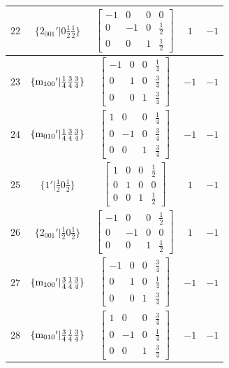 \documentclass[fleqn,8pt]{jsarticle}
\begin{document}
\begin{longtable}{ccccc}
$ 22 $ & $ \{2{}_{001}{}'|0 \frac{1}{2} \frac{1}{2}\} $ & $ \begin{bmatrix} -1 & 0 & 0 & 0 \\ 0 & -1 & 0 & \frac{1}{2} \\ 0 & 0 & 1 & \frac{1}{2} \end{bmatrix} $ & $ 1 $ & $ -1 $ \\ \hline
$ 23 $ & $ \{{\rm m}_{100}{}'|\frac{1}{4} \frac{3}{4} \frac{3}{4}\} $ & $ \begin{bmatrix} -1 & 0 & 0 & \frac{1}{4} \\ 0 & 1 & 0 & \frac{3}{4} \\ 0 & 0 & 1 & \frac{3}{4} \end{bmatrix} $ & $ -1 $ & $ -1 $ \\ \hline
$ 24 $ & $ \{{\rm m}_{010}{}'|\frac{1}{4} \frac{3}{4} \frac{3}{4}\} $ & $ \begin{bmatrix} 1 & 0 & 0 & \frac{1}{4} \\ 0 & -1 & 0 & \frac{3}{4} \\ 0 & 0 & 1 & \frac{3}{4} \end{bmatrix} $ & $ -1 $ & $ -1 $ \\ \hline
$ 25 $ & $ \{1{}'|\frac{1}{2} 0 \frac{1}{2}\} $ & $ \begin{bmatrix} 1 & 0 & 0 & \frac{1}{2} \\ 0 & 1 & 0 & 0 \\ 0 & 0 & 1 & \frac{1}{2} \end{bmatrix} $ & $ 1 $ & $ -1 $ \\ \hline
$ 26 $ & $ \{2{}_{001}{}'|\frac{1}{2} 0 \frac{1}{2}\} $ & $ \begin{bmatrix} -1 & 0 & 0 & \frac{1}{2} \\ 0 & -1 & 0 & 0 \\ 0 & 0 & 1 & \frac{1}{2} \end{bmatrix} $ & $ 1 $ & $ -1 $ \\ \hline
$ 27 $ & $ \{{\rm m}_{100}{}'|\frac{3}{4} \frac{1}{4} \frac{3}{4}\} $ & $ \begin{bmatrix} -1 & 0 & 0 & \frac{3}{4} \\ 0 & 1 & 0 & \frac{1}{4} \\ 0 & 0 & 1 & \frac{3}{4} \end{bmatrix} $ & $ -1 $ & $ -1 $ \\ \hline
$ 28 $ & $ \{{\rm m}_{010}{}'|\frac{3}{4} \frac{1}{4} \frac{3}{4}\} $ & $ \begin{bmatrix} 1 & 0 & 0 & \frac{3}{4} \\ 0 & -1 & 0 & \frac{1}{4} \\ 0 & 0 & 1 & \frac{3}{4} \end{bmatrix} $ & $ -1 $ & $ -1 $ \\ \hline

\end{longtable}
\end{document}
